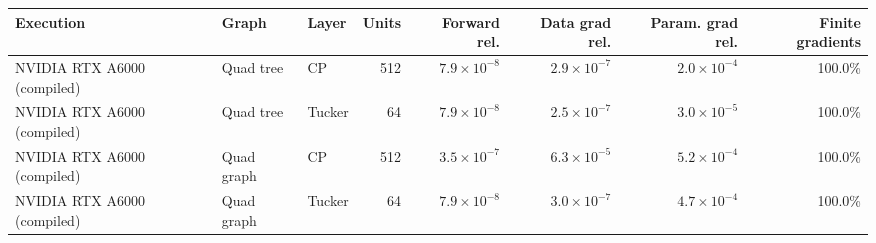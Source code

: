 \begin{tabular}{lllrrrrr}
\toprule
Execution & Graph & Layer & Units & Forward rel. & Data grad rel. & Param. grad rel. & Finite gradients \\
\midrule
NVIDIA RTX A6000 (compiled) & Quad tree & CP & 512 & $7.9\mathbin{\times}10^{-8}$ & $2.9\mathbin{\times}10^{-7}$ & $2.0\mathbin{\times}10^{-4}$ & 100.0\% \\
NVIDIA RTX A6000 (compiled) & Quad tree & Tucker & 64 & $7.9\mathbin{\times}10^{-8}$ & $2.5\mathbin{\times}10^{-7}$ & $3.0\mathbin{\times}10^{-5}$ & 100.0\% \\
NVIDIA RTX A6000 (compiled) & Quad graph & CP & 512 & $3.5\mathbin{\times}10^{-7}$ & $6.3\mathbin{\times}10^{-5}$ & $5.2\mathbin{\times}10^{-4}$ & 100.0\% \\
NVIDIA RTX A6000 (compiled) & Quad graph & Tucker & 64 & $7.9\mathbin{\times}10^{-8}$ & $3.0\mathbin{\times}10^{-7}$ & $4.7\mathbin{\times}10^{-4}$ & 100.0\% \\
\bottomrule
\end{tabular}
